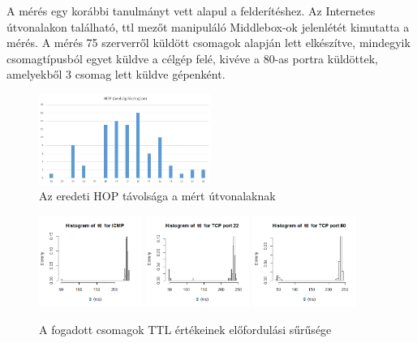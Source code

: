 A mérés egy korábbi tanulmányt\cite{middlebox} vett alapul a felderítéshez. Az Internetes útvonalakon található, ttl mezőt manipuláló Middlebox-ok jelenlétét kimutatta a mérés. A mérés 75 szerverről küldött csomagok alapján lett elkészítve, mindegyik csomagtípusból egyet küldve a célgép felé, kivéve a 80-as portra küldöttek, amelyekből 3 csomag lett küldve gépenként.


\begin{figure}[!ht]
	\centering
	\includegraphics[width=0.5\textwidth, keepaspectratio]{figures/hop-hist.png}
	\caption{Az eredeti HOP távolsága a mért útvonalaknak}
	\label{fig:hop-hist}
\end{figure}


\begin{figure}[!ht]
	\centering
	\includegraphics[width=0.3\textwidth, keepaspectratio]{figures/hist-ttl-icmp.png}
	\includegraphics[width=0.3\textwidth, keepaspectratio]{figures/ttl-hist-22.png}
	\includegraphics[width=0.3\textwidth, keepaspectratio]{figures/ttl-hist-port80.png}
	\caption{A fogadott csomagok TTL értékeinek előfordulási sűrűsége}
	\label{fig:ttl-hist}
\end{figure}

